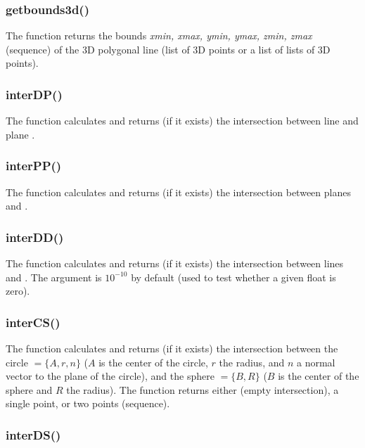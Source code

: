 \subsubsection{getbounds3d()}

The function  returns the bounds \emph{xmin, xmax, ymin, ymax, zmin, zmax} (sequence) of the 3D polygonal line  (list of 3D points or a list of lists of 3D points).

\subsubsection{interDP()}

The function  calculates and returns (if it exists) the intersection between line  and plane .

\subsubsection{interPP()}

The function  calculates and returns (if it exists) the intersection between planes  and .

\subsubsection{interDD()}

The function  calculates and returns (if it exists) the intersection between lines  and . The argument  is $10^{-10}$ by default (used to test whether a given float is zero).

\subsubsection{interCS()}

The function  calculates and returns (if it exists) the intersection between the circle $=\{A,r,n\}$ ($A$ is the center of the circle, $r$ the radius, and $n$ a normal vector to the plane of the circle), and the sphere $=\{B,R\}$ ($B$ is the center of the sphere and $R$ the radius). The function returns either \nil (empty intersection), a single point, or two points (sequence).

\subsubsection{interDS()}

